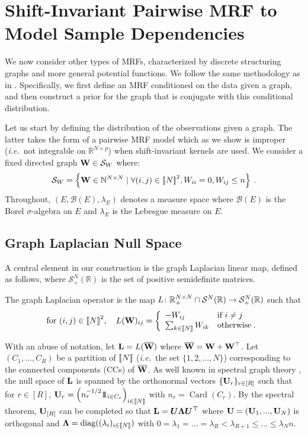 \section {Shift-Invariant Pairwise MRF to Model Sample Dependencies} \label{sec:graph_structure}

We now consider other types of MRFs, characterized by discrete structuring graphs and more general potential functions. We follow the same methodology as in . Specifically, we first define an MRF conditioned on the data given a graph, and then construct a prior for the graph that is conjugate with this conditional distribution.

Let us start by defining the distribution of the observations given a graph. The latter takes the form of a pairwise MRF model which as we show is improper (\textit{i.e.}\ not integrable on $\mathbb{R}^{N \times p}$) when shift-invariant kernels are used. We consider a fixed directed graph ${\mathbf{W}} \in \mathcal{S}_{W}$ where:
\begin{align}
    \mathcal{S}_{W} = \left\{{\mathbf{W}} \in \mathbb{N}^{N \times N} \mid \forall (i,j) \in {[\![N]\!]}^2, W_{ii}=0, W_{ij} \leq n \right\} \:.
\end{align}
Throughout, $(E, \mathcal{B}(E), \lambda_E)$ denotes a measure space where $\mathcal{B}(E)$ is the Borel $\sigma$-algebra on $E$ and $\lambda_E$ is the Lebesgue measure on $E$.

\subsection{Graph Laplacian Null Space}\label{sec:laplacian_prop}
A central element in our construction is the graph Laplacian linear map, defined as follows, where $\mathcal{S}^N_+(\mathbb{R})$ is the set of positive semidefinite matrices.
\begin{definition}\label{graph_laplacian}
The graph Laplacian operator is the map $L \colon \mathbb{R}_+^{N \times N} \cap \mathcal{S}^N(\mathbb{R}) \to \mathcal{S}^N_+(\mathbb{R})$ such that
$$\text{for } (i,j) \in {[\![N]\!]}^2, \quad L({\mathbf{W}})_{ij} = \left\{
\begin{array}{ll}
    - W_{ij} & \text{if } i \neq j \\
    \sum_{k \in {[\![N]\!]}} W_{ik} & \text{otherwise} \:.
\end{array} 
\right. $$
\end{definition}
With an abuse of notation, let $\mathbf{L} = L(\overline{{\mathbf{W}}})$ where $\overline{{\mathbf{W}}} = {\mathbf{W}} + {\mathbf{W}}^\top$. Let $(C_1,...,C_{R})$ be a partition of ${[\![N]\!]}$ (\textit{i.e.}\ the set $\{1,2,...,N\}$) corresponding to the connected components (CCs) of $\overline{{\mathbf{W}}}$. As well known in spectral graph theory \citep{Chung97}, the null space of $\mathbf{L}$ is spanned by the orthonormal vectors $\{\mathbf{U}_{r}\}_{r \in [R]}$ such that for $r \in [R]$,
$\mathbf{U}_{r} = \left(n_r^{-1/2} 1\!\!1_{i \in C_r}\right)_{i \in {[\![N]\!]}}$ with $n_r = \operatorname{Card}(C_r)$. By the spectral theorem, $\mathbf{U}_{[R]}$ can be completed so that $\mathbf{L} = \bm{U \Lambda U^\top}$ where $\mathbf{U} = (\mathbf{U}_1, ..., \mathbf{U}_N)$ is orthogonal and $\bm{\Lambda} = \operatorname{diag}((\lambda_i)_{i \in {[\![N]\!]}})$ with $0 = \lambda_1 = ... = \lambda_R < \lambda_{R+1} \leq ... \leq \lambda_Nn$. 

